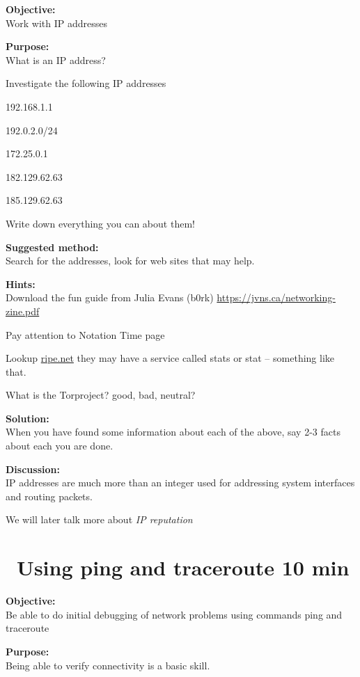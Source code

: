 \documentclass[a4paper,11pt,notitlepage]{report}
\begin{document}
{\bf Objective:}\\
Work with IP addresses

{\bf Purpose:}\\
What is an IP address?

Investigate the following IP addresses
\begin{list2}
\item 192.168.1.1
\item 192.0.2.0/24
\item 172.25.0.1
\item 182.129.62.63
\item 185.129.62.63
\end{list2}

Write down everything you can about them!

{\bf Suggested method:}\\
Search for the addresses, look for web sites that may help.

{\bf Hints:}\\
Download the fun guide from Julia Evans (b0rk) \url{https://jvns.ca/networking-zine.pdf}

Pay attention to Notation Time page

Lookup \url{ripe.net} they may have a service called stats or stat -- something like that.

What is the Torproject? good, bad, neutral?

{\bf Solution:}\\
When you have found some information about each of the above, say 2-3 facts about each you are done.

{\bf Discussion:}\\
IP addresses are much more than an integer used for addressing system interfaces and routing packets.

We will later talk more about \emph{IP reputation}


\chapter{\faExclamationTriangle\ Using ping and traceroute 10 min}
\label{ex:ping}



{\bf Objective:}\\
Be able to do initial debugging of network problems using commands ping and traceroute

{\bf Purpose:}\\
Being able to verify connectivity is a basic skill.
\end{document}

